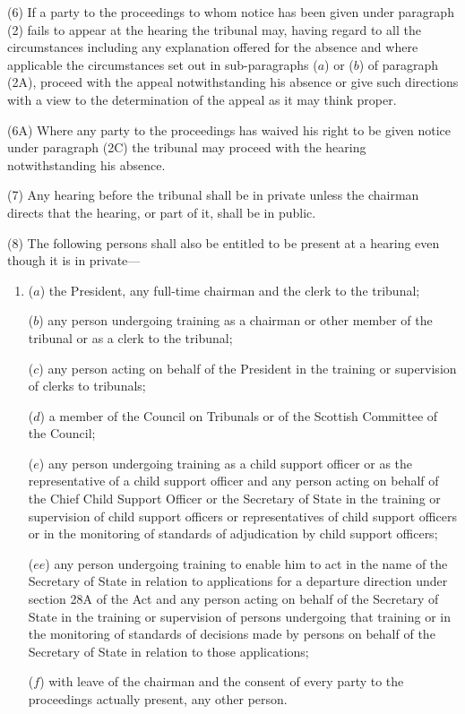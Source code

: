 \documentclass[a4paper]{article}
\begin{document}
(6) If a party to the proceedings to whom notice has been given under paragraph (2) fails to appear at the hearing the tribunal may, having regard to all the circumstances including any explanation offered for the absence
and where applicable the circumstances set out in sub-paragraphs ($a$) or ($b$) of paragraph (2A),  %
proceed with the appeal notwithstanding his absence or give such directions with a view to the determination of the appeal as it may think proper.

(6A) Where any party to the proceedings has waived his right to be given notice under paragraph (2C) the tribunal may proceed with the hearing notwithstanding his absence.

(7) Any hearing before the tribunal shall be in private unless the chairman directs that the hearing, or part of it, shall be in public.

(8) The following persons shall also be entitled to be present at a hearing even though it is in private---
\begin{enumerate}\item[]
($a$) the President, any full-time chairman and the clerk to the tribunal;

($b$) any person undergoing training as a chairman or other member of the tribunal or as a clerk to the tribunal;

($c$) any person acting on behalf of the President in the training or supervision of clerks to tribunals;

($d$) a member of the Council on Tribunals or of the Scottish Committee of the Council;

($e$) any person undergoing training as a child support officer or as the representative of a child support officer and any person acting on behalf of the Chief Child Support Officer or the Secretary of State in the training or supervision of child support officers or representatives of child support officers or in the monitoring of standards of adjudication by child support officers;

($ee$) any person undergoing training to enable him to act in the name of the
Secretary of State in relation to applications for a departure direction under
section 28A of the Act and any person acting on behalf of the Secretary of State
in the training or supervision of persons undergoing that training or in the
monitoring of standards of decisions made by persons on behalf of the Secretary
of State in relation to those applications;

($f$) with leave of the chairman and the consent of every party to the proceedings actually present, any other person.
\end{enumerate}
\end{document}
